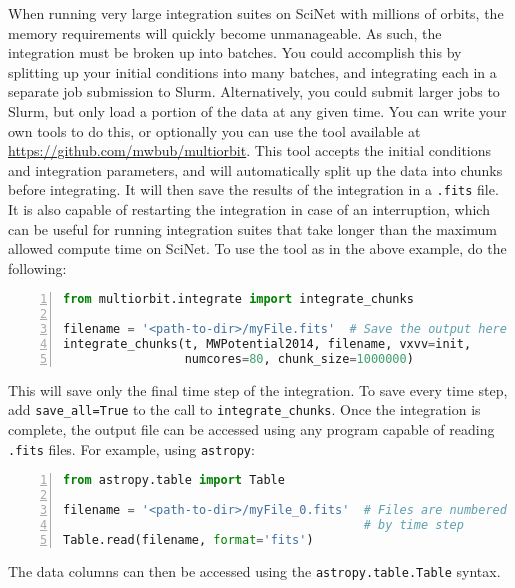\documentclass[12pt]{article}
\begin{document}
When running very large integration suites on SciNet with millions of orbits, the memory requirements will quickly become unmanageable. As such, the integration must be broken up into batches. You could accomplish this by splitting up your initial conditions into many batches, and integrating each in a separate job submission to Slurm. Alternatively, you could submit larger jobs to Slurm, but only load a portion of the data at any given time. You can write your own tools to do this, or optionally you can use the tool available at \url{https://github.com/mwbub/multiorbit}. This tool accepts the initial conditions and integration parameters, and will automatically split up the data into chunks before integrating. It will then save the results of the integration in a \texttt{.fits} file. It is also capable of restarting the integration in case of an interruption, which can be useful for running integration suites that take longer than the maximum allowed compute time on SciNet. To use the tool as in the above example, do the following:
\begin{lstlisting}[language=python, numbers=left]
from multiorbit.integrate import integrate_chunks

filename = '<path-to-dir>/myFile.fits'  # Save the output here
integrate_chunks(t, MWPotential2014, filename, vxvv=init,
				 numcores=80, chunk_size=1000000)
\end{lstlisting}
This will save only the final time step of the integration. To save every time step, add \texttt{save\_all=True} to the call to \texttt{integrate\_chunks}. Once the integration is complete, the output file can be accessed using any program capable of reading \texttt{.fits} files. For example, using \texttt{astropy}:
\begin{lstlisting}[language=python, numbers=left]
from astropy.table import Table

filename = '<path-to-dir>/myFile_0.fits'  # Files are numbered 
										  # by time step
Table.read(filename, format='fits')
\end{lstlisting}
The data columns can then be accessed using the \texttt{astropy.table.Table} syntax.

\end{document}
